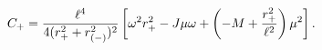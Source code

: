 \begin{equation}
C_+ = {\ell^4 \over {4(r_+^2+r_{(-)}^2)^2}}
\left[
\omega^2 r_+^2 -J \mu \omega  + \left ( -M + {r_+^2 \over \ell^2} \right ) \mu^2
\right] .
\label{cp}
\end{equation}

